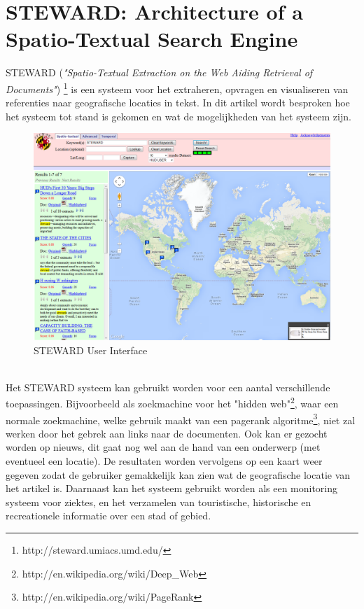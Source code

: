 \documentclass[twoside,openright]{uva-bachelor-thesis}
\begin{document}
	\section{STEWARD: Architecture of a Spatio-Textual Search Engine \cite{STEWARD}}
		STEWARD (\textit{"Spatio-Textual Extraction on the Web Aiding Retrieval of Documents"}) \footnote{http://steward.umiacs.umd.edu/} is een systeem voor het extraheren, opvragen en visualiseren van referenties naar geografische locaties in tekst. In dit artikel wordt besproken hoe het systeem tot stand is gekomen en wat de mogelijkheden van het systeem zijn.
		\begin{figure}[!htb]
			\centering
			\includegraphics[scale=0.3]{./img/STEWARD.png}
			\caption{STEWARD User Interface}
		\end{figure}
		\\[0.5cm]
		Het STEWARD systeem kan gebruikt worden voor een aantal verschillende toepassingen. Bijvoorbeeld als zoekmachine voor het "hidden web"\footnote{http://en.wikipedia.org/wiki/Deep\_Web}, waar een normale zoekmachine, welke gebruik maakt van een pagerank algoritme\footnote{http://en.wikipedia.org/wiki/PageRank}, niet zal werken door het gebrek aan links naar de documenten. Ook kan er gezocht worden op nieuws, dit gaat nog wel aan de hand van een onderwerp (met eventueel een locatie). De resultaten worden vervolgens op een kaart weer gegeven zodat de gebruiker gemakkelijk kan zien wat de geografische locatie van het artikel is. Daarnaast kan het systeem gebruikt worden als een monitoring systeem voor ziektes, en het verzamelen van touristische, historische en recreationele informatie over een stad of gebied.
\end{document}
